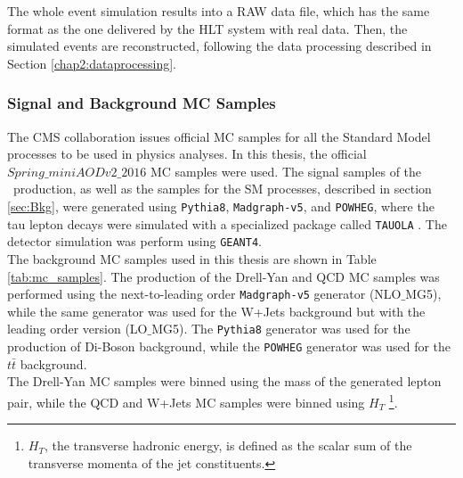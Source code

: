 \noindent The whole event simulation results into a RAW data file, which has the same 
format as the one delivered by the HLT system with real 
data. Then, the simulated events are reconstructed, following the data processing 
described in Section \ref{chap2:dataprocessing}. \\

\subsubsection{Signal and Background MC Samples}
\label{subsubsec:MCSamples}

\noindent The CMS collaboration issues official MC samples for all the 
Standard Model processes to be used in physics analyses. In this thesis, the official 
$Spring\_miniAODv2\_2016$ MC samples were used. The signal samples of 
the \Zprime~production, as well as the samples for the SM processes, described in section \ref{sec:Bkg},
were generated  using \texttt{Pythia8}, \texttt{Madgraph-v5}, and \texttt{POWHEG}, where 
the tau lepton decays were simulated with a specialized package called \texttt{TAUOLA} \cite{bib:tauola}.
The detector simulation was perform using \texttt{GEANT4}. \\

\noindent The background MC samples used in this thesis are shown in Table \ref{tab:mc_samples}. The 
production of the Drell-Yan and QCD MC samples was performed using the next-to-leading order
\texttt{Madgraph-v5} generator (NLO$\_$MG5), while the same generator was used 
for the W+Jets background but with the leading order version (LO$\_$MG5). The 
\texttt{Pythia8} generator was used for the production of Di-Boson background, while 
the \texttt{POWHEG} generator was used for the $t\bar{t}$ background. \\

\noindent The Drell-Yan MC samples were binned using the mass of the generated lepton pair, while the QCD and W+Jets MC samples 
were binned using $H_{T}$ \footnote{$H_{T}$, the transverse hadronic energy, is defined as the scalar sum of the
transverse momenta of the jet constituents.}.\\

